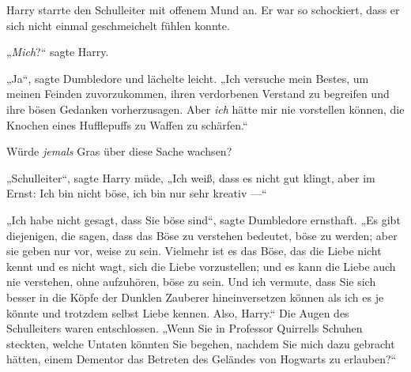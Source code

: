 Harry starrte den Schulleiter mit offenem Mund an. Er war so schockiert, dass er sich nicht einmal geschmeichelt fühlen konnte.

„\emph{Mich}?“ sagte Harry.

„Ja“, sagte Dumbledore und lächelte leicht.
„Ich versuche mein Bestes, um meinen Feinden zuvorzukommen, ihren verdorbenen Verstand zu begreifen und ihre bösen Gedanken vorherzusagen. Aber \emph{ich} hätte mir nie vorstellen können, die Knochen eines Hufflepuffs zu Waffen zu schärfen.“

Würde \emph{jemals} Gras über diese Sache wachsen?

„Schulleiter“, sagte Harry müde,
„Ich weiß, dass es nicht gut klingt, aber im Ernst: Ich bin nicht böse, ich bin nur sehr kreativ —“

„Ich habe nicht gesagt, dass Sie böse sind“, sagte Dumbledore ernsthaft.
„Es gibt diejenigen, die sagen, dass das Böse zu verstehen bedeutet, böse zu werden; aber sie geben nur vor, weise zu sein. Vielmehr ist es das Böse, das die Liebe nicht kennt und es nicht wagt, sich die Liebe vorzustellen; und es kann die Liebe auch nie verstehen, ohne aufzuhören, böse zu sein. Und ich vermute, dass Sie sich besser in die Köpfe der Dunklen Zauberer hineinversetzen können als ich es je könnte und trotzdem selbst Liebe kennen. Also, Harry.“ Die Augen des Schulleiters waren entschlossen.
„Wenn Sie in Professor Quirrells Schuhen steckten, welche Untaten könnten Sie begehen, nachdem Sie mich dazu gebracht hätten, einem Dementor das Betreten des Geländes von Hogwarts zu erlauben?“

